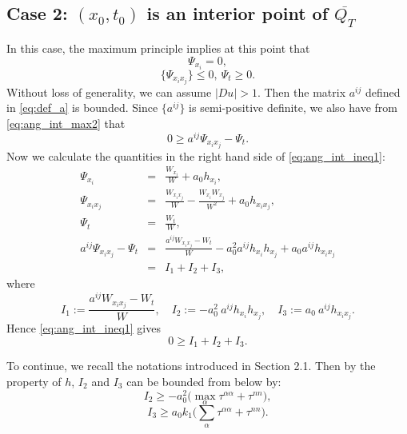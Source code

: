 \documentclass[12pt]{article}
\numberwithin{equation}{section}
\theoremstyle{plain}
\theoremstyle{definition}
\theoremstyle{remark}
\begin{document}
\subsection{Case 2: $(x_0,t_0)$ is an interior point of $\overline{Q_T}$} \label{sec:ang_grad_case_2}
In this case, the maximum principle implies at this point that
\begin{equation} \label{eq:ang_int_max1}
    \Psi_{x_i} = 0,
\end{equation}
\begin{equation}  \label{eq:ang_int_max2}
    \{\Psi_{x_i x_j}\} \leq 0,\ \Psi_t \geq 0.
\end{equation}
Without loss of generality, we can assume $|Du|>1$. Then the matrix $a^{ij}$ defined in \eqref{eq:def_a} is bounded. Since $\{a^{ij}\}$ is semi-positive definite, we also have from \eqref{eq:ang_int_max2} that 
\begin{equation} \label{eq:ang_int_ineq1}
    0 \geq a^{ij} \Psi_{x_i x_j} - \Psi_t.
\end{equation}
Now we calculate the quantities in the right hand side of \eqref{eq:ang_int_ineq1}:
\begin{eqnarray*}
       \Psi_{x_i} &=& \frac{W_{x_i}}{W} + a_0 h_{x_i}, \\ 
    \Psi_{x_i x_j} &=& \frac{W_{x_i x_j}}{W} - \frac{W_{x_i} W_{x_j}}{W^2} + a_0 h_{x_i x_j}, \\
    \Psi_t &=& \frac{W_t}{W},\\
    a^{ij} \Psi_{x_i x_j} - \Psi_t &=& \frac{a^{ij} W_{x_i x_j} -W_t}{W} - a_0^2 a^{ij} h_{x_i} h_{x_j} + a_0 a^{ij} h_{x_i x_j}\\
    &=& I_1 + I_2 + I_3,
\end{eqnarray*}
where
\begin{equation}
I_1 :=  \frac{a^{ij} W_{x_i x_j} -W_t}{W}, \quad
I_2 := -  a_0^2 \ a^{ij} h_{x_i} h_{x_j}, \quad
I_3 := a_0 \ a^{ij} h_{x_i x_j}.
\end{equation}
Hence \eqref{eq:ang_int_ineq1} gives
\begin{equation}\label{0I1I2I3}
0 \geq I_1 + I_2 + I_3 .
\end{equation}

To continue, we recall the notations introduced in Section 2.1. Then by the property of $h$, $I_2$ and $I_3$ can be bounded from below by:
\begin{equation}\label{angI2est}
    I_2 \geq - a_0^2 \big(\max_{\alpha} \tau^{\alpha \alpha} + \tau^{n n}\big),
\end{equation}
\begin{equation}\label{angI3est}
    I_3 \geq a_0 k_1 \big(\sum_{\alpha} \tau^{\alpha \alpha} + \tau^{n n}\big).
\end{equation}
\end{document}
